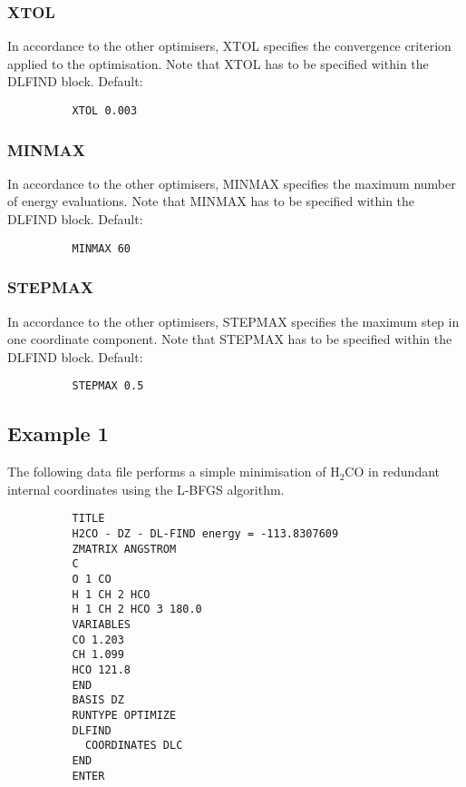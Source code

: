 \documentclass[11pt,fleqn]{article}
\begin{document}
\subsubsection{XTOL}

In accordance to the other optimisers, XTOL specifies the convergence
criterion applied to the optimisation. Note that XTOL has to be specified
within the DLFIND block. Default:

{
\footnotesize
\begin{verbatim}
          XTOL 0.003
\end{verbatim}
} 

\subsubsection{MINMAX}

In accordance to the other optimisers, MINMAX specifies the maximum number of
energy evaluations. Note that MINMAX has to be specified
within the DLFIND block. Default:

{
\footnotesize
\begin{verbatim}
          MINMAX 60
\end{verbatim}
} 

\subsubsection{STEPMAX}

In accordance to the other optimisers, STEPMAX specifies the maximum step in
one coordinate component. Note that STEPMAX has to be specified
within the DLFIND block. Default:

{
\footnotesize
\begin{verbatim}
          STEPMAX 0.5
\end{verbatim}
} 

\subsection{Example 1}

The following data file performs a simple minimisation of H$_2$CO in redundant
internal coordinates using the L-BFGS algorithm.

{
\footnotesize
\begin{verbatim}
          TITLE
          H2CO - DZ - DL-FIND energy = -113.8307609
          ZMATRIX ANGSTROM
          C
          O 1 CO
          H 1 CH 2 HCO
          H 1 CH 2 HCO 3 180.0
          VARIABLES
          CO 1.203
          CH 1.099
          HCO 121.8
          END
          BASIS DZ
          RUNTYPE OPTIMIZE
          DLFIND
            COORDINATES DLC
          END
          ENTER
\end{verbatim}
}
\end{document}
